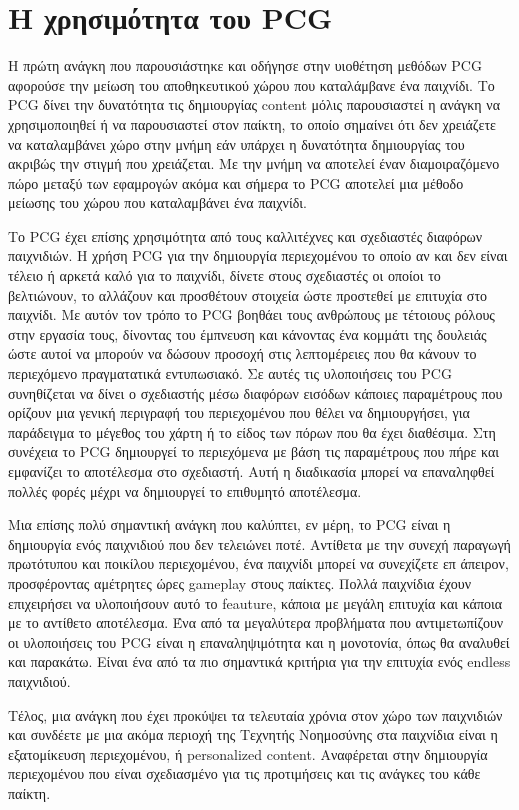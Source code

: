 \section{Η χρησιμότητα του PCG}
	Η πρώτη ανάγκη που παρουσιάστηκε και οδήγησε στην υιοθέτηση μεθόδων PCG αφορούσε την μείωση του αποθηκευτικού χώρου που καταλάμβανε ένα παιχνίδι. Το PCG δίνει την δυνατότητα τις δημιουργίας content μόλις παρουσιαστεί η ανάγκη να χρησιμοποιηθεί ή να παρουσιαστεί στον παίκτη, το οποίο σημαίνει ότι δεν χρειάζετε να καταλαμβάνει χώρο στην μνήμη εάν υπάρχει η δυνατότητα δημιουργίας του ακριβώς την στιγμή που χρειάζεται. Με την μνήμη να αποτελεί έναν διαμοιραζόμενο πώρο μεταξύ των εφαμρογών ακόμα και σήμερα το PCG αποτελεί μια μέθοδο μείωσης του χώρου που καταλαμβάνει ένα παιχνίδι.
\par
	Το PCG έχει επίσης χρησιμότητα από τους καλλιτέχνες και σχεδιαστές διαφόρων παιχνιδιών. Η χρήση PCG για την δημιουργία περιεχομένου το οποίο αν και δεν είναι τέλειο ή αρκετά καλό για το παιχνίδι, δίνετε στους σχεδιαστές οι οποίοι το βελτιώνουν, το αλλάζουν και προσθέτουν στοιχεία ώστε προστεθεί με επιτυχία στο παιχνίδι. Με αυτόν τον τρόπο το PCG βοηθάει τους ανθρώπους με τέτοιους ρόλους στην εργασία τους, δίνοντας του έμπνευση και κάνοντας ένα κομμάτι της δουλειάς ώστε αυτοί να μπορούν να δώσουν προσοχή στις λεπτομέρειες που θα κάνουν το περιεχόμενο πραγματατικά εντυπωσιακό. Σε αυτές τις υλοποιήσεις του PCG συνηθίζεται να δίνει ο σχεδιαστής μέσω διαφόρων εισόδων κάποιες παραμέτρους που ορίζουν μια γενική περιγραφή του περιεχομένου που θέλει να δημιουργήσει, για παράδειγμα το μέγεθος του χάρτη ή το είδος των πόρων που θα έχει διαθέσιμα. Στη συνέχεια το PCG δημιουργεί το περιεχόμενα με βάση τις παραμέτρους που πήρε και εμφανίζει το αποτέλεσμα στο σχεδιαστή. Αυτή η διαδικασία μπορεί να επαναληφθεί πολλές φορές μέχρι να δημιουργεί το επιθυμητό αποτέλεσμα.
\par
	Μια επίσης πολύ σημαντική ανάγκη που καλύπτει, εν μέρη, το PCG είναι η δημιουργία ενός παιχνιδιού που δεν τελειώνει ποτέ. Αντίθετα με την συνεχή παραγωγή πρωτότυπου και ποικίλου περιεχομένου, ένα παιχνίδι μπορεί να συνεχίζετε επ άπειρον, προσφέροντας αμέτρητες ώρες gameplay στους παίκτες. Πολλά παιχνίδια έχουν επιχειρήσει να υλοποιήσουν αυτό το feauture, κάποια με μεγάλη επιτυχία και κάποια με το αντίθετο αποτέλεσμα. Ένα από τα μεγαλύτερα προβλήματα που αντιμετωπίζουν οι υλοποιήσεις του PCG είναι η επαναληψιμότητα και η μονοτονία, όπως θα αναλυθεί και παρακάτω. Είναι ένα από τα πιο σημαντικά κριτήρια για την επιτυχία ενός endless παιχνιδιού.
\par
	Τέλος, μια ανάγκη που έχει προκύψει τα τελευταία χρόνια στον χώρο των παιχνιδιών και συνδέετε με μια ακόμα περιοχή της Τεχνητής Νοημοσύνης στα παιχνίδια είναι η εξατομίκευση περιεχομένου, ή personalized content. Αναφέρεται στην δημιουργία περιεχομένου που είναι σχεδιασμένο για τις προτιμήσεις και τις ανάγκες του κάθε παίκτη.

